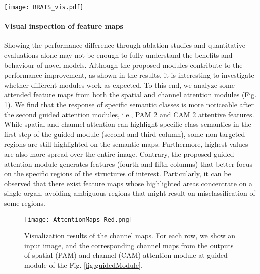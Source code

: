 \documentclass[journal]{IEEEtran}
\begin{document}
\begin{figure*}[h!]
    \centering
    \texttt{[image: BRATS\_vis.pdf]}
    \caption{\textcolor{black}{Results on three subjects on the BRATS Challenge dataset. In these figures, the following tumor structures are depicted: oedema (green), enhancing core (yellow) and necrotic or tumor core (red).}}
        \label{fig:visualImagesBRATS}
\end{figure*}

\paragraph*{\textbf{Visual inspection of feature maps}}

Showing the performance difference through ablation studies and quantitative evaluations alone may not be enough to fully understand the benefits and behaviour of novel models. Although the proposed modules contribute to the performance improvement, as shown in the results, it is interesting to investigate whether different modules work as expected. To this end, we analyze some attended feature maps from both the spatial and channel attention modules \textcolor{black}{(Fig. \ref{fig:attmaps})}. We find that the response of specific semantic classes is more noticeable after the second guided attention modules, i.e., PAM 2 and CAM 2 attentive features. While spatial and channel attention can highlight specific class semantics in the first step of the guided module (second and third column), some non-targeted regions are still highlighted on the semantic maps. Furthermore, highest values are also more spread over the entire image. Contrary, the proposed guided attention module generates features (fourth and fifth columns) that better focus on the specific regions of the structures of interest. Particularly, it can be observed that there exist feature maps whose highlighted areas concentrate on a single organ, avoiding ambiguous regions that might result on misclassification of some regions.

\begin{figure}[h!]
    \centering
    \texttt{[image: AttentionMaps\_Red.png]}
    \caption{Visualization results of the channel maps. For each row, we show an input image, and the corresponding channel maps from the outputs of spatial (PAM) and channel (CAM) attention module at guided module of the Fig. \ref{fig:guidedModule}.}
    \label{fig:attmaps}
\end{figure}
\end{document}
